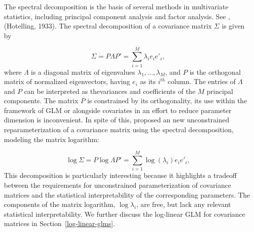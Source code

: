 \documentclass[../chapter-1-introduction.tex]{subfiles}
\begin{document}
The spectral decomposition is the basis of several methods in multivariate statistics, including principal component analysis and factor analysis. See \citet{Anderson84a},  (Hotelling, 1933). The spectral decomposition of a covariance matrix $\Sigma$ is given by

\begin{equation} \label{eq:spectral-decomposition}
\Sigma = P \Lambda P' = \sum_{i = 1}^M \lambda_i e_i e'_i,
\end{equation}
\noindent
where $\Lambda$ is a diagonal matrix of eigenvalues $\lambda_1,\dots, \lambda_M$, and $P$ is the orthogonal matrix of normalized eigenvectors, having  $e_i$ as its $i^{th}$ column. The entries of $\Lambda$ and $P$ can be interpreted as thevariances and coefficients of the $M$ principal components. The matrix $P$ is constrained by its orthogonality, its use within the framework of GLM or alongside covariates in an effort to reduce parameter dimension is inconvenient. In spite of this,  \citet{chiu1996matrix} proposed an new unconstrained reparameterization of a covariance matrix using the spectral decomposition, modeling the matrix logarithm:

\begin{equation} \label{eq:spectral-decomposition}
\log \Sigma = P \log\Lambda P' = \sum_{i = 1}^M \log\left(\lambda_i \right)e_i e'_i,
\end{equation}
\noindent
This decomposition is particularly interesting because it highlights a tradeoff between the requirements for unconstrained parameterization of covariance matrices and the statistical interpretability of the corresponding parameters. The components of the matrix logarithm, $\log \lambda_i$, are free, but lack any relevant statistical interpretability. We further discuss the log-linear GLM for covariance matrices in Section~\ref{log-linear-glms}.
\end{document}
